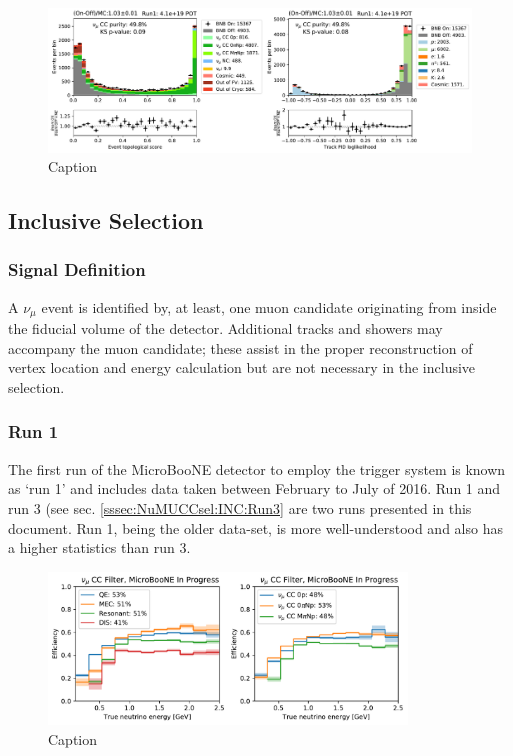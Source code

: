 \begin{figure}
    \centering
    \includegraphics[width=\textwidth]{NuMuCCsel/Images/run1/numu_pret_run1.pdf}
    \caption{Caption}
    \label{fig:numu_topo_pid}
\end{figure}

\subsection{Inclusive Selection}
\label{ssec:NuMUCCsel:INC}

\subsubsection{Signal Definition}
\label{sssec:NuMUCCsel:INC:signaldef}
\par A $\nu_{\mu}$ event is identified by, at least, one muon candidate originating from inside the fiducial volume of the detector. Additional tracks and showers may accompany the muon candidate; these assist in the proper reconstruction of vertex location and energy calculation but are not necessary in the inclusive selection. 

\subsubsection{Run 1}
\label{sssec:NuMUCCsel:INC:Run1}
\par The first run of the MicroBooNE detector to employ the trigger system is known as `run 1' and includes data taken between February to July of 2016. Run 1 and run 3 (see sec. \ref{sssec:NuMUCCsel:INC:Run3} are two runs presented in this document. Run 1, being the older data-set, is more well-understood and also has a higher statistics than run 3. 



\begin{figure}
    \centering
    \includegraphics[width=0.85\textwidth]{NuMuCCsel/Images/run1/numu_efficiency_run1.pdf}
    \caption{Caption}
    \label{fig:numu_eff_r1}
\end{figure}

